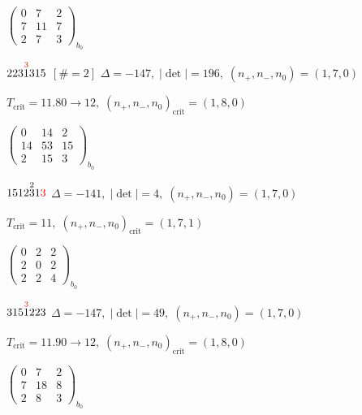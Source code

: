\documentclass[10pt]{article}
\begin{document}
\hspace{2em}$\left(\begin{smallmatrix}0 & 7 & 2 \\ 7 & 11 & 7 \\ 2 & 7 & 3\end{smallmatrix}\right)_{\!b_0}$

$223\overset{\textcolor{red}{3}}{1}315$ $\scriptstyle [\#=2]$ \quad $\Delta=-147,\; |\det|=196,\; (n_+,n_-,n_0)=(1,7,0)$

\hspace{1em}$T_{\text{crit}}=11.80 \to 12,\; (n_+,n_-,n_0)_{\text{crit}}=(1,8,0)$

\hspace{2em}$\left(\begin{smallmatrix}0 & 14 & 2 \\ 14 & 53 & 15 \\ 2 & 15 & 3\end{smallmatrix}\right)_{\!b_0}$

\smallskip

$1512\overset{2}{3}1\textcolor{red}{3}$ \quad $\Delta=-141,\; |\det|=4,\; (n_+,n_-,n_0)=(1,7,0)$

\hspace{1em}$T_{\text{crit}}=11,\; (n_+,n_-,n_0)_{\text{crit}}=(1,7,1)$

\hspace{2em}$\left(\begin{smallmatrix}0 & 2 & 2 \\ 2 & 0 & 2 \\ 2 & 2 & 4\end{smallmatrix}\right)_{\!b_0}$

\smallskip

$315\overset{\textcolor{red}{3}}{1}223$ \quad $\Delta=-147,\; |\det|=49,\; (n_+,n_-,n_0)=(1,7,0)$

\hspace{1em}$T_{\text{crit}}=11.90 \to 12,\; (n_+,n_-,n_0)_{\text{crit}}=(1,8,0)$

\hspace{2em}$\left(\begin{smallmatrix}0 & 7 & 2 \\ 7 & 18 & 8 \\ 2 & 8 & 3\end{smallmatrix}\right)_{\!b_0}$

\smallskip
\end{document}
